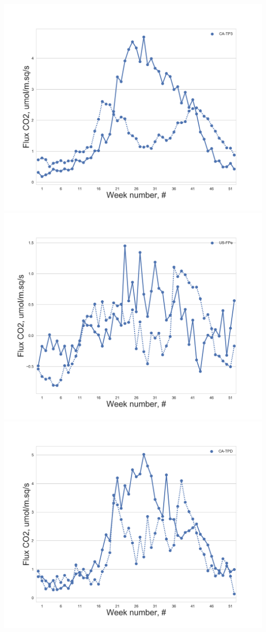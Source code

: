 \documentclass{beamer}
\begin{document}
\begin{frame}
\begin{columns}[t]
\centering
\includegraphics[width=\textwidth]{Reverse_engin/20.png}\\
\includegraphics[width=\textwidth]{Reverse_engin/23.png}
\centering
\includegraphics[width=\textwidth]{Reverse_engin/22.png}\\

\end{columns}
\end{frame}
\end{document}
